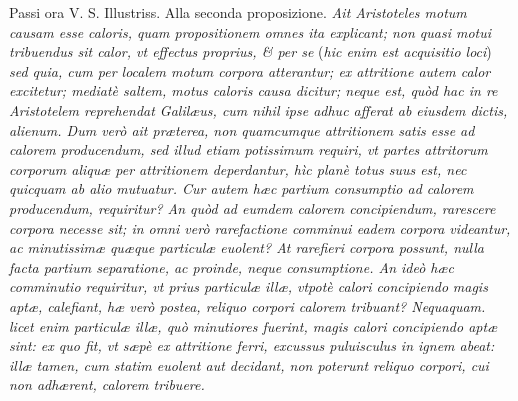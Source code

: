 \documentclass[11pt,twoside,openany]{book}
\begin{document}
\par\bigskip\noindent{}\enspace Passi ora V. S. Illustriss. Alla seconda proposizione. \textit{Ait Aristoteles motum causam esse caloris, quam propositionem omnes ita explicant; non quasi motui tribuendus sit calor, vt effectus proprius, \& per se }(\textit{hic enim est acquisitio loci})\textit{ sed quia, cum per localem motum corpora atterantur; ex attritione autem calor excitetur; mediatè saltem, motus caloris causa dicitur; neque est, quòd hac in re Aristotelem reprehendat Galilæus, cum nihil ipse adhuc afferat ab eiusdem dictis, alienum. Dum verò ait præterea, non quamcumque attritionem satis esse ad calorem producendum, sed illud etiam potissimum requiri, vt partes attritorum corporum aliquæ per attritionem deperdantur, hìc planè totus suus est, nec quicquam ab alio mutuatur. Cur autem hæc partium consumptio ad calorem producendum, requiritur? An quòd ad eumdem calorem concipiendum, rarescere corpora necesse sit; in omni verò rarefactione comminui eadem corpora videantur, ac minutissimæ quæque particulæ e}\textit{uolent? At rarefieri corpora possunt, nulla facta partium separatione, ac proinde, neque consumptione. An ideò hæc comminutio requiritur, vt prius particulæ illæ, vtpotè calori concipiendo }\textit{magis aptæ, calefiant, hæ verò postea, reliquo corpori calorem tribuant? Nequaquam. licet enim particulæ illæ, quò minutiores fuerint, magis calori concipiendo aptæ sint: ex quo fit, vt sæpè ex attritione ferri, excussus puluisculus in ignem abeat: illæ tamen, cum statim euolent aut decidant, non poterunt reliquo corpori, cui non adhærent, calorem tribuere.}
\end{document}
